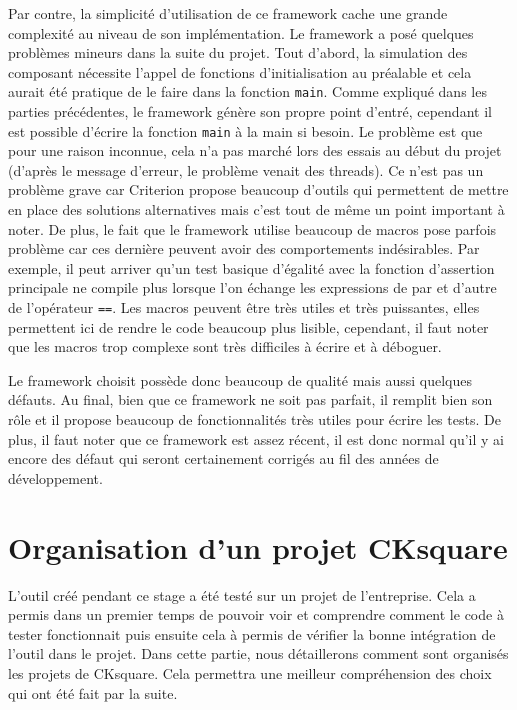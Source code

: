 \documentclass[a4paper]{article}
\begin{document}
Par contre, la simplicité d'utilisation de ce framework cache une grande
complexité au niveau de son implémentation. Le framework a posé quelques
problèmes mineurs dans la suite du projet. Tout d'abord, la simulation des
composant nécessite l'appel de fonctions d'initialisation au préalable et cela
aurait été pratique de le faire dans la fonction \verb|main|. Comme
expliqué dans les parties précédentes, le framework génère son propre point
d'entré, cependant il est possible d'écrire la fonction \verb|main| à la
main si besoin. Le problème est que pour une raison inconnue, cela n'a pas
marché lors des essais au début du projet (d'après le message d'erreur, le
problème venait des threads). Ce n'est pas un problème grave car Criterion
propose beaucoup d'outils qui permettent de mettre en place des solutions
alternatives mais c'est tout de même un point important à noter. De plus, le
fait que le framework utilise beaucoup de macros pose parfois problème car ces
dernière peuvent avoir des comportements indésirables. Par exemple, il peut
arriver qu'un test basique d'égalité avec la fonction d'assertion principale ne
compile plus lorsque l'on échange les expressions de par et d'autre de
l'opérateur \verb|==|. Les macros peuvent être très utiles et très
puissantes, elles permettent ici de rendre le code beaucoup plus lisible,
cependant, il faut noter que les macros trop complexe sont très difficiles à
écrire et à déboguer.

Le framework choisit possède donc beaucoup de qualité mais aussi quelques
défauts. Au final, bien que ce framework ne soit pas parfait, il remplit
bien son rôle et il propose beaucoup de fonctionnalités très utiles pour
écrire les tests. De plus, il faut noter que ce framework est assez récent, il
est donc normal qu'il y ai encore des défaut qui seront certainement corrigés
au fil des années de développement.
\section{Organisation d'un projet CKsquare}%

L'outil créé pendant ce stage a été testé sur un projet de l'entreprise. Cela a
permis dans un premier temps de pouvoir voir et comprendre comment le code à
tester fonctionnait puis ensuite cela à permis de vérifier la bonne intégration de
l'outil dans le projet. Dans cette partie, nous détaillerons comment sont
organisés les projets de CKsquare. Cela permettra une meilleur compréhension des
choix qui ont été fait par la suite.
\end{document}
